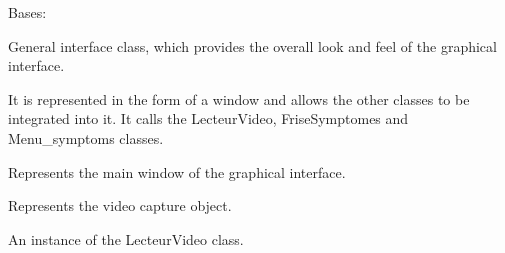 \documentclass[letterpaper,10pt,english]{sphinxmanual}
\begin{document}
\begin{fulllineitems}
\label{\detokenize{general_interface:general_interface.InterfaceGenerale}}
\pysigstartsignatures
{}
\pysigstopsignatures
\sphinxAtStartPar
Bases: 

\sphinxAtStartPar
General interface class, which provides the overall look and feel of the graphical interface.

\sphinxAtStartPar
It is represented in the form of a window and allows the other classes to be integrated into it.
It calls the LecteurVideo, FriseSymptomes and Menu\_symptoms classes.

\begin{fulllineitems}
\label{\detokenize{general_interface:general_interface.InterfaceGenerale.fenetre}}
\pysigstartsignatures
{}
\pysigstopsignatures
\sphinxAtStartPar
Represents the main window of the graphical interface.

\end{fulllineitems}


\begin{fulllineitems}
\label{\detokenize{general_interface:general_interface.InterfaceGenerale.cap}}
\pysigstartsignatures
{}
\pysigstopsignatures
\sphinxAtStartPar
Represents the video capture object.

\end{fulllineitems}


\begin{fulllineitems}
\label{\detokenize{general_interface:general_interface.InterfaceGenerale.lec_video}}
\pysigstartsignatures
{}
\pysigstopsignatures
\sphinxAtStartPar
An instance of the LecteurVideo class.


\end{fulllineitems}
\end{fulllineitems}
\end{document}
